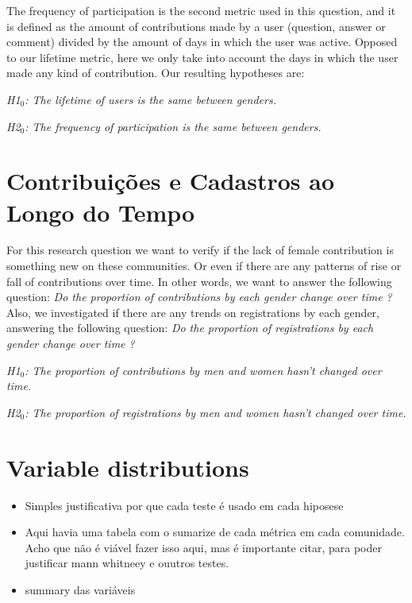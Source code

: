 The frequency of participation is the second metric used in this question, and it is defined as the amount of contributions made by a user (question, answer or comment) divided by the amount of days in which the user was active. Opposed to our lifetime metric, here we only take into account the days in which the user made any kind of contribution. Our resulting hypotheses are:

\textit{H1$_0$: The lifetime of users is the same between genders.}

\textit{H2$_0$: The frequency of participation is the same between genders.}


\section{Contribuições e Cadastros ao Longo do Tempo} %
\label{sub:contribui_es_e_cadastros_ao_longo_do_tempo}
For this research question we want to verify if the lack of female contribution is something new on these communities. Or even if there are any patterns of rise or fall of contributions over time. In other words, we want to answer the following question: \textit{Do the proportion of contributions by each gender change over time ?} Also, we investigated if there are any trends on registrations by each gender, answering the following question: \textit{Do the proportion of registrations by each gender change over time ?}

\textit{H1$_0$: The proportion of contributions by men and women hasn't changed over time.}

\textit{H2$_0$: The proportion of registrations by men and women hasn't changed over time.}

\section{Variable distributions}
\label{sub:distributions}
\begin{itemize}
	\item Simples justificativa por que cada teste é usado em cada hiposese
	\item Aqui havia uma tabela com o sumarize de cada métrica em cada comunidade. Acho que não é viável fazer isso aqui, mas é importante citar, para poder  justificar mann whitneey e ouutros testes.
	\item summary das variáveis
\end{itemize}
